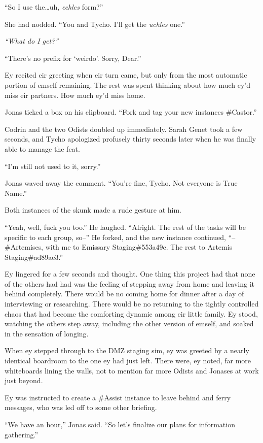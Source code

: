 ``So I use the\ldots uh, \emph{echles} form?''

She had nodded. ``You and Tycho. I'll get the \emph{uchles} one.''

\emph{``What do I get?''}

``There's no prefix for `weirdo'. Sorry, Dear.''

Ey recited eir greeting when eir turn came, but only from the most automatic portion of emself remaining. The rest was spent thinking about how much ey'd miss eir partners. How much ey'd miss home.

Jonas ticked a box on his clipboard. ``Fork and tag your new instances \#Castor.''

Codrin and the two Odists doubled up immediately. Sarah Genet took a few seconds, and Tycho apologized profusely thirty seconds later when he was finally able to manage the feat.

``I'm still not used to it, sorry.''

Jonas waved away the comment. ``You're fine, Tycho. Not everyone is True Name.''

Both instances of the skunk made a rude gesture at him.

``Yeah, well, fuck you too.'' He laughed. ``Alright. The rest of the tasks will be specific to each group, so--'' He forked, and the new instance continued, ``--\#Artemises, with me to Emissary Staging\#553a49c. The rest to Artemis Staging\#ad89ae3.''

Ey lingered for a few seconds and thought. One thing this project had that none of the others had had was the feeling of stepping away from home and leaving it behind completely. There would be no coming home for dinner after a day of interviewing or researching. There would be no returning to the tightly controlled chaos that had become the comforting dynamic among eir little family. Ey stood, watching the others step away, including the other version of emself, and soaked in the sensation of longing.

When ey stepped through to the DMZ staging sim, ey was greeted by a nearly identical boardroom to the one ey had just left. There were, ey noted, far more whiteboards lining the walls, not to mention far more Odists and Jonases at work just beyond.

Ey was instructed to create a \#Assist instance to leave behind and ferry messages, who was led off to some other briefing.

``We have an hour,'' Jonas said. ``So let's finalize our plans for information gathering.''

